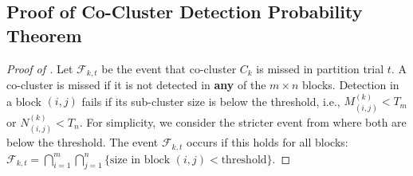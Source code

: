 \documentclass[journal]{IEEEtran}
\theoremstyle{definition}
\theoremstyle{remark} %
\begin{document}
\subsection{Proof of Co-Cluster Detection Probability Theorem}
\label{appendix:proof-co-cluster-detection}

\begin{proof}[Proof of ]
    Let $\mathcal{F}_{k,t}$ be the event that co-cluster $C_k$ is missed in partition trial $t$. A co-cluster is missed if it is not detected in \textbf{any} of the $m \times n$ blocks. Detection in a block $(i,j)$ fails if its sub-cluster size is below the threshold, i.e., $M_{(i,j)}^{(k)} < T_m$ or $N_{(i,j)}^{(k)} < T_n$. For simplicity, we consider the stricter event from  where both are below the threshold. The event $\mathcal{F}_{k,t}$ occurs if this holds for all blocks: $\mathcal{F}_{k,t} = \bigcap_{i=1}^m \bigcap_{j=1}^n \{\text{size in block }(i,j) < \text{threshold}\}$.


\end{proof}
\end{document}
